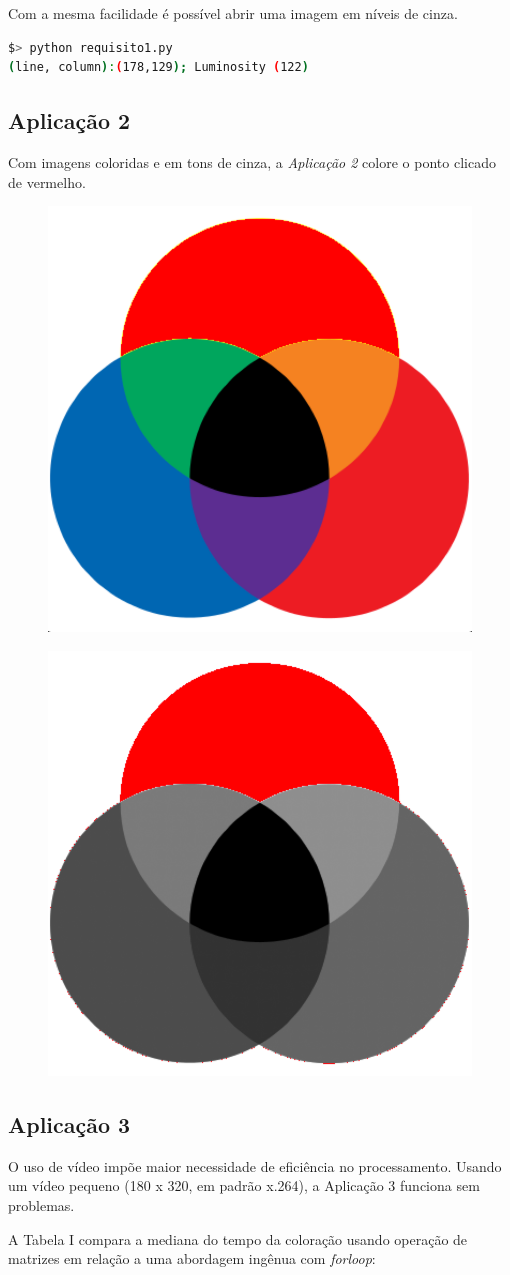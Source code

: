 \documentclass[conference]{IEEEtran}
\begin{document}
Com a mesma facilidade é possível abrir uma imagem em níveis de cinza.

\begin{lstlisting}[language=bash]
$> python requisito1.py
(line, column):(178,129); Luminosity (122)
\end{lstlisting}
\subsection*{Aplicação 2}
Com imagens coloridas e em tons de cinza, a \textit{Aplicação 2} colore o ponto clicado de vermelho.
\begin{figure}[ht!]
\begin{center}
\includegraphics[width=0.28\columnwidth]{requisito2_color.png}
\end{center}
\end{figure}
\begin{figure}[ht!]
\begin{center}
\includegraphics[width=0.28\columnwidth]{requisito2_gray.png}
\end{center}
\end{figure}
\subsection*{Aplicação 3}
O uso de vídeo impõe maior necessidade de eficiência no processamento. Usando um vídeo pequeno (180 x 320, em padrão x.264), a Aplicação 3 funciona sem problemas.

A Tabela I compara a mediana do tempo da coloração usando operação de matrizes em relação a uma abordagem ingênua com \textit{forloop}:
\end{document}
